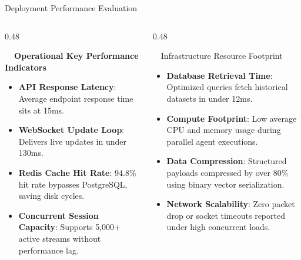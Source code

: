 \documentclass{beamer}
\begin{document}
\begin{frame}{Deployment Performance Evaluation}
\vspace{-0.2cm}

\begin{columns}[T]
    \begin{column}{0.48\textwidth}
        \begin{smallcard}[0.98\textwidth, top=3pt, bottom=3pt, left=4pt, right=4pt, boxsep=0.5pt]
            \centering \textbf{\textcolor{primaryDark}{\small {}~~Operational Key Performance Indicators}}
            \vspace{0.08cm}
            \fontsize{6.8pt}{8.2pt}\selectfont
            \begin{itemize}\setlength\itemsep{4.5pt}\setlength\parskip{0pt}
                \item \textbf{API Response Latency}: Average endpoint response time sits at 15ms.
                \item \textbf{WebSocket Update Loop}: Delivers live updates in under 130ms.
                \item \textbf{Redis Cache Hit Rate}: 94.8\% hit rate bypasses PostgreSQL, saving disk cycles.
                \item \textbf{Concurrent Session Capacity}: Supports 5,000+ active streams without performance lag.
            \end{itemize}
        \end{smallcard}
    \end{column}
    
    \begin{column}{0.48\textwidth}
        \begin{orangecard}[height=5.2cm]{~~Infrastructure Resource Footprint}
            \fontsize{6.8pt}{8.2pt}\selectfont
            \begin{itemize}\setlength\itemsep{3.5pt}\setlength\parskip{0pt}
                \item \textbf{Database Retrieval Time}: Optimized queries fetch historical datasets in under 12ms.
                \item \textbf{Compute Footprint}: Low average CPU and memory usage during parallel agent executions.
                \item \textbf{Data Compression}: Structured payloads compressed by over 80\% using binary vector serialization.
                \item \textbf{Network Scalability}: Zero packet drop or socket timeouts reported under high concurrent loads.
            \end{itemize}
        \end{orangecard}
    \end{column}
\end{columns}


\end{frame}
\end{document}
